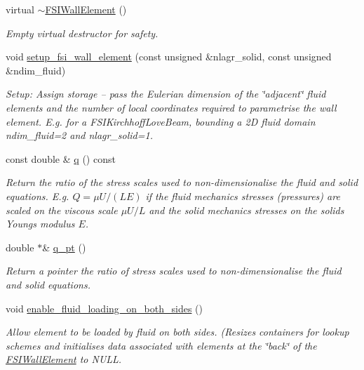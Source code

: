 \begin{DoxyCompactItemize}
virtual \hyperlink{classoomph_1_1FSIWallElement_a498254a4b31cfee252a2015a754b03df}{$\sim$\+F\+S\+I\+Wall\+Element} ()
\begin{DoxyCompactList}\small\item\em Empty virtual destructor for safety. \end{DoxyCompactList}\item 
void \hyperlink{classoomph_1_1FSIWallElement_a487a050241512f3979c4d67bb40b2a63}{setup\+\_\+fsi\+\_\+wall\+\_\+element} (const unsigned \&nlagr\+\_\+solid, const unsigned \&ndim\+\_\+fluid)
\begin{DoxyCompactList}\small\item\em Setup\+: Assign storage -- pass the Eulerian dimension of the \char`\"{}adjacent\char`\"{} fluid elements and the number of local coordinates required to parametrise the wall element. E.\+g. for a F\+S\+I\+Kirchhoff\+Love\+Beam, bounding a 2D fluid domain ndim\+\_\+fluid=2 and nlagr\+\_\+solid=1. \end{DoxyCompactList}\item 
const double \& \hyperlink{classoomph_1_1FSIWallElement_abfc3907362f9cd1a852631f87cbff7aa}{q} () const
\begin{DoxyCompactList}\small\item\em Return the ratio of the stress scales used to non-\/dimensionalise the fluid and solid equations. E.\+g. $ Q = \mu U/(LE) $ if the fluid mechanics stresses (pressures) are scaled on the viscous scale $ \mu U / L$ and the solid mechanics stresses on the solid\textquotesingle{}s Young\textquotesingle{}s modulus $ E $. \end{DoxyCompactList}\item 
double $\ast$\& \hyperlink{classoomph_1_1FSIWallElement_ab407513775b5250b016ab91fa98dc1a0}{q\+\_\+pt} ()
\begin{DoxyCompactList}\small\item\em Return a pointer the ratio of stress scales used to non-\/dimensionalise the fluid and solid equations. \end{DoxyCompactList}\item 
void \hyperlink{classoomph_1_1FSIWallElement_a0dc3efdeb5d0abf0ba473c0145652358}{enable\+\_\+fluid\+\_\+loading\+\_\+on\+\_\+both\+\_\+sides} ()
\begin{DoxyCompactList}\small\item\em Allow element to be loaded by fluid on both sides. (Resizes containers for lookup schemes and initialises data associated with elements at the \char`\"{}back\char`\"{} of the \hyperlink{classoomph_1_1FSIWallElement}{F\+S\+I\+Wall\+Element} to N\+U\+LL. \end{DoxyCompactList}\item 

\end{DoxyCompactItemize}
